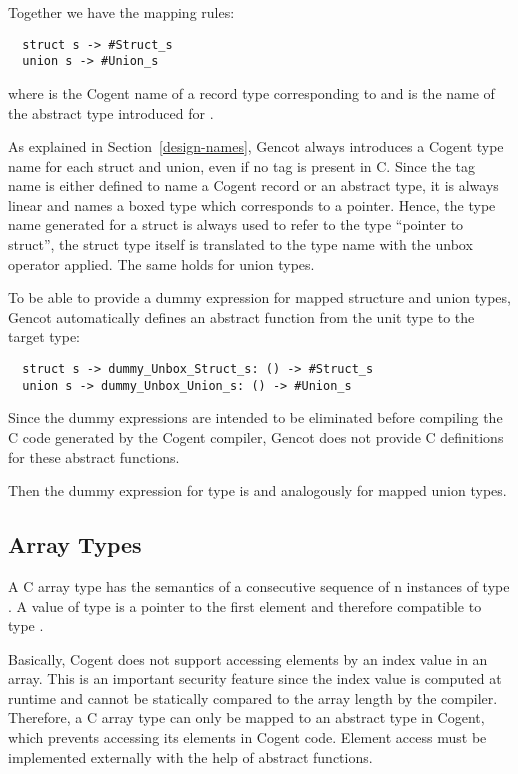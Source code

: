 Together we have the mapping rules:
\begin{verbatim}
  struct s -> #Struct_s
  union s -> #Union_s
\end{verbatim}
where  is the Cogent name of a record type corresponding to  and  is the
name of the abstract type introduced for .

As explained in Section~\ref{design-names}, Gencot always introduces a Cogent type name for each struct and union,
even if no tag is present in C. Since the tag name is either defined to name a Cogent record or an abstract type,
it is always linear and names a boxed type which corresponds to a pointer. Hence, the type name generated for a struct
is always used to refer to the type ``pointer to struct'', the struct type itself is translated to the type name 
with the unbox operator applied. The same holds for union types.

To be able to provide a dummy expression for mapped structure and union types, Gencot automatically defines an 
abstract function from the unit type to the target type:
\begin{verbatim}
  struct s -> dummy_Unbox_Struct_s: () -> #Struct_s
  union s -> dummy_Unbox_Union_s: () -> #Union_s
\end{verbatim}
Since the dummy expressions are intended to be eliminated before compiling the 
C code generated by the Cogent compiler, Gencot does not provide C definitions for these abstract functions. 

Then the dummy expression for type  is  and analogously
for mapped union types. 

\subsection{Array Types}
\label{design-types-array}

A C array type  has the semantics of a consecutive sequence of n instances of type . A value
of type  is a pointer to the first element and therefore compatible to type .

Basically, Cogent does not support accessing elements by an index value in an array. 
This is an important security feature since the index value is computed at runtime and cannot be statically 
compared to the array length by the compiler. Therefore, a C array type can only be mapped to an abstract type 
in Cogent, which prevents accessing its elements in Cogent code. Element access must be implemented externally 
with the help of abstract functions.

